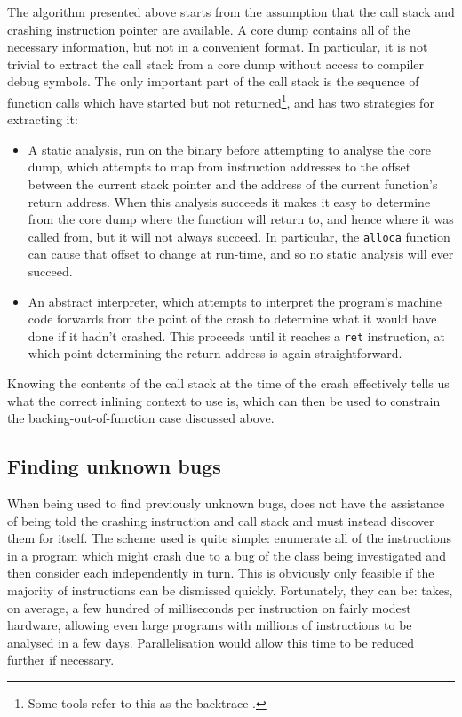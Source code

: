 The algorithm presented above starts from the assumption that the call
stack and crashing instruction pointer are available.  A core dump
contains all of the necessary information, but not in a convenient
format.  In particular, it is not trivial to extract the call stack
from a core dump without access to compiler debug symbols.  The only
important part of the call stack is the sequence of function calls
which have started but not returned\footnote{Some tools refer to this
  as the backtrace .}, and {\technique} has two strategies
for extracting it:

\begin{itemize}
\item
  A static analysis, run on the binary before attempting to analyse
  the core dump, which attempts to map from instruction addresses to
  the offset between the current stack pointer and the address of the
  current function's return address.  When this analysis succeeds it
  makes it easy to determine from the core dump where the function
  will return to, and hence where it was called from, but it will not
  always succeed.  In particular, the \verb|alloca| function can cause
  that offset to change at run-time, and so no static analysis will
  ever succeed.
\item
  An abstract interpreter, which attempts to interpret the program's
  machine code forwards from the point of the crash to determine what
  it would have done if it hadn't crashed.  This proceeds until it
  reaches a \verb|ret| instruction, at which point determining the
  return address is again straightforward.
\end{itemize}


Knowing the contents of the call stack at the time of the crash
effectively tells us what the correct inlining context to use is,
which can then be used to constrain the backing-out-of-function case
discussed above.

\subsection{Finding unknown bugs}
\label{sect:derive:unknown_bugs}


When being used to find previously unknown bugs, {\technique} does not
have the assistance of being told the crashing instruction and call
stack and must instead discover them for itself.  The scheme used is
quite simple: enumerate all of the instructions in a program which
might crash due to a bug of the class being investigated and then
consider each independently in turn.  This is obviously only feasible
if the majority of instructions can be dismissed quickly.
Fortunately, they can be: {\implementation} takes, on average, a few
hundred of milliseconds per instruction on fairly modest hardware,
allowing even large programs with millions of instructions to be
analysed in a few days.
Parallelisation would allow this time to be reduced further if
necessary.

